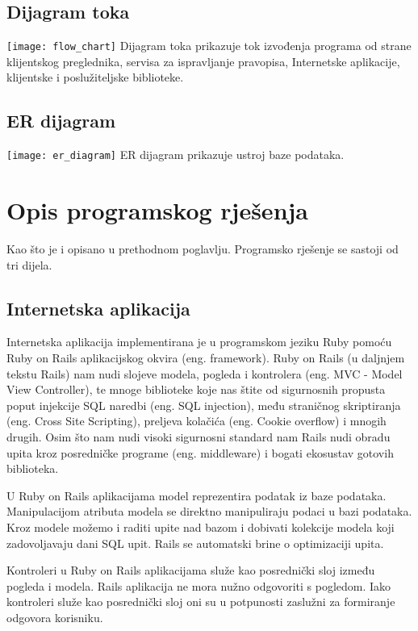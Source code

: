 \documentclass[times, utf8, zavrsni]{fer}
\begin{document}
\section{Dijagram toka}
\texttt{[image: flow\_chart]}
Dijagram toka prikazuje tok izvođenja programa od strane klijentskog
preglednika, servisa za ispravljanje pravopisa, Internetske aplikacije,
klijentske i poslužiteljske biblioteke.

\section{ER dijagram}
\texttt{[image: er\_diagram]}
ER dijagram prikazuje ustroj baze podataka.

\chapter{Opis programskog rješenja}
Kao što je i opisano u prethodnom poglavlju. Programsko rješenje se sastoji od
tri dijela.

\section{Internetska aplikacija}
Internetska aplikacija implementirana je u programskom jeziku Ruby pomoću Ruby
on Rails aplikacijskog okvira (eng. framework). Ruby on Rails (u daljnjem tekstu
Rails) nam nudi slojeve modela, pogleda i kontrolera (eng. MVC - Model View
Controller), te mnoge biblioteke koje nas štite od sigurnosnih propusta poput
injekcije SQL naredbi (eng. SQL injection), među straničnog skriptiranja (eng.
Cross Site Scripting), preljeva kolačića (eng. Cookie overflow) i mnogih drugih.
Osim što nam nudi visoki sigurnosni standard nam Rails nudi obradu upita kroz
posredničke programe (eng. middleware) i bogati ekosustav gotovih biblioteka.
\cite{rormanual}

U Ruby on Rails aplikacijama model reprezentira podatak iz baze podataka.
Manipulacijom atributa modela se direktno manipuliraju podaci u bazi podataka.
Kroz modele možemo i raditi upite nad bazom i dobivati kolekcije modela koji
zadovoljavaju dani SQL upit. Rails se automatski brine o optimizaciji upita.

Kontroleri u Ruby on Rails aplikacijama služe kao posrednički sloj između
pogleda i modela. Rails aplikacija ne mora nužno odgovoriti s pogledom. Iako
kontroleri služe kao posrednički sloj oni su u potpunosti zaslužni za formiranje
odgovora korisniku.
\end{document}
